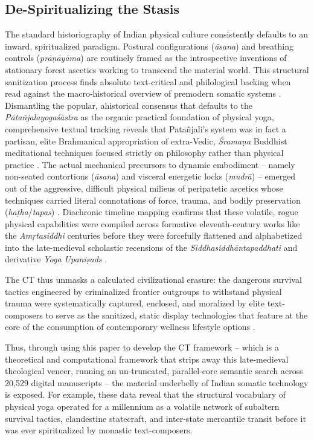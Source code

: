 \documentclass[11pt,twoside,letterpaper]{article}
\begin{document}
\subsection{De-Spiritualizing the Stasis}
The standard historiography of Indian physical culture consistently defaults to an inward, spiritualized paradigm. Postural configurations (\textit{āsana}) and breathing controls (\textit{prāṇāyāma}) are routinely framed as the introspective inventions of stationary forest ascetics working to transcend the material world. This structural sanitization process finds absolute text-critical and philological backing when read against the macro-historical overview of premodern somatic systems \citep{Mallinson2017}. Dismantling the popular, ahistorical consensus that defaults to the \textit{Pātañjalayogaśāstra} as the organic practical foundation of physical yoga, comprehensive textual tracking reveals that Patañjali’s system was in fact a partisan, elite Brahmanical appropriation of extra-Vedic, \textit{Śramaṇa} Buddhist meditational techniques focused strictly on philosophy rather than physical practice \citep{Mallinson2017}. The actual mechanical precursors to dynamic embodiment – namely non-seated contortions (\textit{āsana}) and visceral energetic locks (\textit{mudrā}) – emerged out of the aggressive, difficult physical milieus of peripatetic ascetics whose techniques carried literal connotations of force, trauma, and bodily preservation (\textit{haṭha}/\textit{tapas}) \citep{Mallinson2017}. Diachronic timeline mapping confirms that these volatile, rogue physical capabilities were compiled across formative eleventh-century works like the \textit{Amṛtasiddhi} centuries before they were forcefully flattened and alphabetized into the late-medieval scholastic recensions of the \textit{Siddhasiddhāntapaddhati} and derivative \textit{Yoga Upaniṣads} \citep{Birch2024, Mallinson2017}.

The CT thus unmasks a calculated civilizational erasure: the dangerous survival tactics engineered by criminalized frontier outgroups to withstand physical trauma were systematically captured, enclosed, and moralized by elite text-composers to serve as the sanitized, static display technologies that feature at the core of the consumption of contemporary wellness lifestyle options \citep{Debnath2024, Mallinson2017, McCartney2021}.

Thus, through using this paper to develop the CT framework -- which is a theoretical and computational framework that strips away this late-medieval theological veneer, running an un-truncated, parallel-core semantic search across 20,529 digital manuscripts -- the material underbelly of Indian somatic technology is exposed. For example, these data reveal that the structural vocabulary of physical yoga operated for a millennium as a volatile network of subaltern survival tactics, clandestine statecraft, and inter-state mercantile transit before it was ever spiritualized by monastic text-composers.
\end{document}
